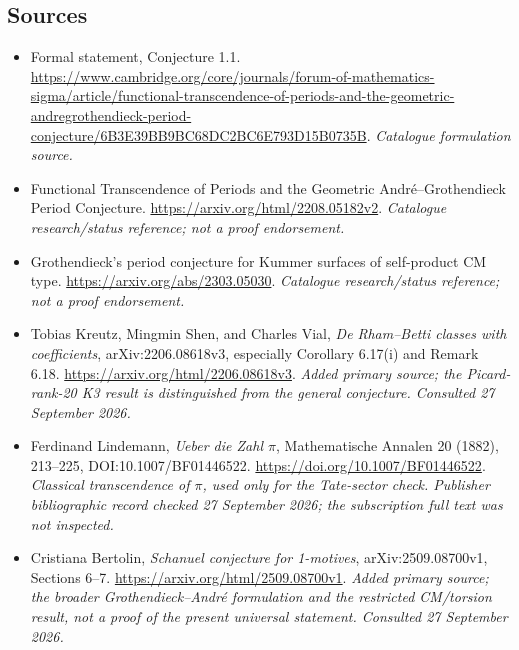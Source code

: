 \documentclass[11pt,a4paper]{article}
\numberwithin{equation}{section}
\begin{document}
\subsection{Sources}
\begin{itemize}\raggedright
\item[\textnormal{[S1]}]\hypertarget{source:statement:1}{} Formal statement, Conjecture 1.1.
\url{https://www.cambridge.org/core/journals/forum-of-mathematics-sigma/article/functional-transcendence-of-periods-and-the-geometric-andregrothendieck-period-conjecture/6B3E39BB9BC68DC2BC6E793D15B0735B}.
{\small\textit{Catalogue formulation source.}}
\item[\textnormal{[S2]}]\hypertarget{source:statement:2}{} Functional Transcendence of Periods and the Geometric André--Grothendieck Period Conjecture.
\url{https://arxiv.org/html/2208.05182v2}.
{\small\textit{Catalogue research/status reference; not a proof endorsement.}}
\item[\textnormal{[S3]}]\hypertarget{source:statement:3}{} Grothendieck's period conjecture for Kummer surfaces of self-product CM type.
\url{https://arxiv.org/abs/2303.05030}.
{\small\textit{Catalogue research/status reference; not a proof endorsement.}}
\item[\textnormal{[E1]}]\hypertarget{extra:statement:1}{} Tobias Kreutz, Mingmin Shen, and Charles Vial, \emph{De Rham--Betti classes with coefficients}, arXiv:2206.08618v3, especially Corollary 6.17(i) and Remark 6.18.
\url{https://arxiv.org/html/2206.08618v3}.
{\small\textit{Added primary source; the Picard-rank-20 K3 result is distinguished from the general conjecture. Consulted 27 September 2026.}}
\item[\textnormal{[E2]}]\hypertarget{extra:statement:2}{} Ferdinand Lindemann, \emph{Ueber die Zahl $\pi$}, Mathematische Annalen 20 (1882), 213--225, DOI:10.1007/BF01446522.
\url{https://doi.org/10.1007/BF01446522}.
{\small\textit{Classical transcendence of $\pi$, used only for the Tate-sector check. Publisher bibliographic record checked 27 September 2026; the subscription full text was not inspected.}}
\item[\textnormal{[E3]}]\hypertarget{extra:statement:3}{} Cristiana Bertolin, \emph{Schanuel conjecture for 1-motives}, arXiv:2509.08700v1, Sections 6--7.
\url{https://arxiv.org/html/2509.08700v1}.
{\small\textit{Added primary source; the broader Grothendieck--Andr\'e formulation and the restricted CM/torsion result, not a proof of the present universal statement. Consulted 27 September 2026.}}
\end{itemize}
\end{document}
